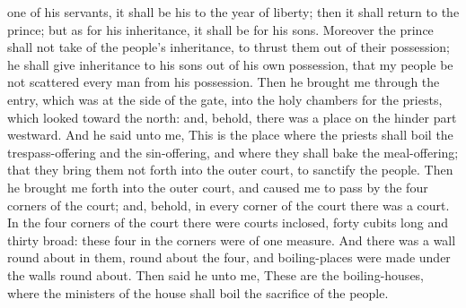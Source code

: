 one of his servants, it shall be his to the year of liberty; then it shall return to the prince; but as for his inheritance, it shall be for his sons. Moreover the prince shall not take of the people’s inheritance, to thrust them out of their possession; he shall give inheritance to his sons out of his own possession, that my people be not scattered every man from his possession.  Then he brought me through the entry, which was at the side of the gate, into the holy chambers for the priests, which looked toward the north: and, behold, there was a place on the hinder part westward. And he said unto me, This is the place where the priests shall boil the trespass-offering and the sin-offering, and where they shall bake the meal-offering; that they bring them not forth into the outer court, to sanctify the people. Then he brought me forth into the outer court, and caused me to pass by the four corners of the court; and, behold, in every corner of the court there was a court. In the four corners of the court there were courts inclosed, forty cubits long and thirty broad: these four in the corners were of one measure. And there was a wall round about in them, round about the four, and boiling-places were made under the walls round about. Then said he unto me, These are the boiling-houses, where the ministers of the house shall boil the sacrifice of the people. 

